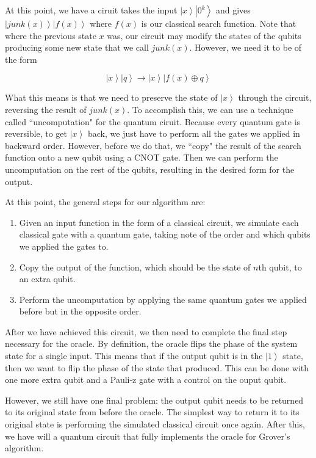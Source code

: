 \documentclass[11pt]{report}
\newcommand{\?}{\stackrel{?}{=}}
\begin{document}
At this point, we have a ciruit takes the input $\left | x \right \rangle \left | 0^{k} \right \rangle$ and gives $\left | junk(x) \right \rangle \left | f(x) \right \rangle$ where $f(x)$ is our classical search function. Note that where the previous state $x$ was, our circuit may modify the states of the qubits producing some new state that we call $junk(x)$. However, we need it to be of the form \cite{kothari12} 

$$\left | x \right \rangle \left | q \right \rangle \to \left | x \right \rangle \left | f(x) \oplus q \right \rangle$$

What this means is that we need to preserve the state of $\left | x \right \rangle$ through the circuit, reversing the result of $junk(x)$. To accomplish this, we can use a technique called ``uncomputation" for the quantum ciruit. Because every quantum gate is reversible, to get $\left | x \right \rangle$ back, we just have to perform all the gates we applied in backward order. However, before we do that, we ``copy" the result of the search function onto a new qubit using a CNOT gate. Then we can perform the uncomputation on the rest of the qubits, resulting in the desired form for the output.

At this point, the general steps for our algorithm are:

\begin{enumerate}
	\item Given an input function in the form of a classical circuit, we simulate each classical gate with a quantum gate, taking note of the order and which qubits we applied the gates to.
	\item Copy the output of the function, which should be the state of $n$th qubit, to an extra qubit.
	\item Perform the uncomputation by applying the same quantum gates we applied before but in the opposite order. 
\end{enumerate}

After we have achieved this circuit, we then need to complete the final step necessary for the oracle. By definition, the oracle flips the phase of the system state for a single input. This means that if the output qubit is in the $\left | 1 \right \rangle$ state, then we want to flip the phase of the state that produced. This can be done with one more extra qubit and a Pauli-z gate with a control on the ouput qubit.

However, we still have one final problem: the output qubit needs to be returned to its original state from before the oracle. The simplest way to return it to its original state is performing the simulated classical circuit once again. After this, we have will a quantum circuit that fully implements the oracle for Grover's algorithm.
\end{document}
